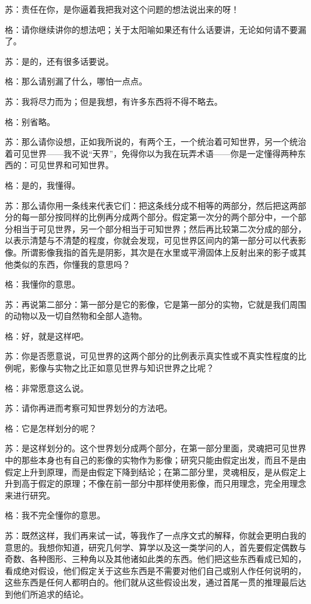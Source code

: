 \documentclass[12pt,oneside]{book}
\begin{document}
苏：责任在你，是你逼着我把我对这个问题的想法说出来的呀！

格：请你继续讲你的想法吧；关于太阳喻如果还有什么话要讲，无论如何请不要漏了。

苏：是的，还有很多话要说。

格：那么请别漏了什么，哪怕一点点。

苏：我将尽力而为；但是我想，有许多东西将不得不略去。

格：别省略。

苏：那么请你设想，正如我所说的，有两个王，一个统治着可知世界，另一个统治着可见世界——我不说“天界”，免得你以为我在玩弄术语——你是一定懂得两种东西的：可见世界和可知世界。

格：是的，我懂得。

苏：那么请你用一条线来代表它们：把这条线分成不相等的两部分，然后把这两部分的每一部分按同样的比例再分成两个部分。假定第一次分的两个部分中，一个部分相当于可见世界，另一个部分相当于可知世界；然后再比较第二次分成的部分，以表示清楚与不清楚的程度，你就会发现，可见世界区间内的第一部分可以代表影像。所谓影像我指的首先是阴影，其次是在水里或平滑固体上反射出来的影子或其他类似的东西，你懂我的意思吗？

格：我懂你的意思。

苏：再说第二部分：第一部分是它的影像，它是第一部分的实物，它就是我们周围的动物以及一切自然物和全部人造物。

格：好，就是这样吧。

苏：你是否愿意说，可见世界的这两个部分的比例表示真实性或不真实性程度的比例呢，影像与实物之比正如意见世界与知识世界之比呢？

格：非常愿意这么说。

苏：请你再进而考察可知世界划分的方法吧。

格：它是怎样划分的呢？

苏：是这样划分的。这个世界划分成两个部分，在第一部分里面，灵魂把可见世界中的那些本身也有自己的影像的实物作为影像；研究只能由假定出发，而且不是由假定上升到原理，而是由假定下降到结论；在第二部分里，灵魂相反，是从假定上升到高于假定的原理；不像在前一部分中那样使用影像，而只用理念，完全用理念来进行研究。

格：我不完全懂你的意思。

苏：既然这样，我们再来试一试，等我作了一点序文式的解释，你就会更明白我的意思的。我想你知道，研究几何学、算学以及这一类学问的人，首先要假定偶数与奇数、各种图形、三种角以及其他诸如此类的东西。他们把这些东西看成已知的，看成绝对假设，他们假定关于这些东西是不需要对他们自己或别人作任何说明的，这些东西是任何人都明白的。他们就从这些假设出发，通过首尾一贯的推理最后达到他们所追求的结论。
\end{document}
